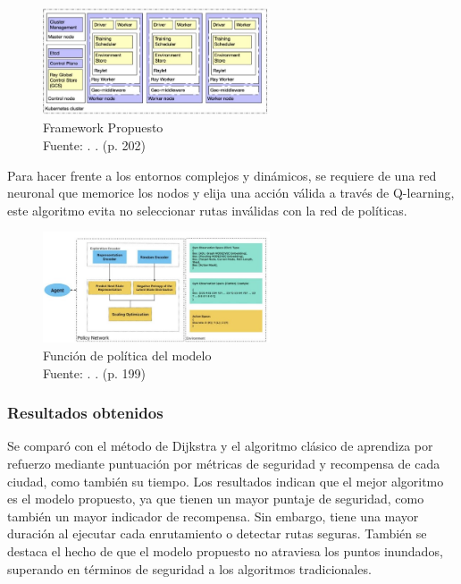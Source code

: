 \begin{figure}[h]
	\begin{center}
		\includegraphics[width=0.6\textwidth]{2/figures/algoMod.jpg}
		\caption{Framework Propuesto\\
			Fuente: \citep*{pr_de}. . (p. 202)}
		\label{1:fig2}
	\end{center}
\end{figure}

Para hacer frente a los entornos complejos y dinámicos, se requiere de una red neuronal que memorice los nodos y elija una acción válida a través de Q-learning, este algoritmo evita no seleccionar rutas inválidas con la red de políticas.

\begin{figure}[h]
	\begin{center}
		\includegraphics[width=0.6\textwidth]{2/figures/politica.jpg}
		\caption{Función de política del modelo \\
			Fuente: \citep*{pr_de}. . (p. 199)}
		\label{1:fig2}
	\end{center}
\end{figure}

\subsubsection{Resultados obtenidos}
Se comparó con el método de Dijkstra y el algoritmo clásico de aprendiza por refuerzo mediante puntuación por métricas de seguridad y recompensa de cada ciudad, como también su tiempo. Los resultados indican que el mejor algoritmo es el modelo propuesto, ya que tienen un mayor puntaje de seguridad, como también un mayor indicador de recompensa. Sin embargo, tiene una mayor duración al ejecutar cada enrutamiento o detectar rutas seguras. También se destaca el hecho de que el modelo propuesto no atraviesa los puntos inundados, superando en términos de seguridad a los algoritmos tradicionales.

